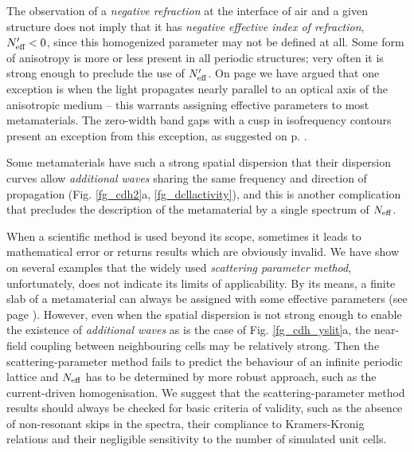 The observation of a \textit{negative refraction} at the interface of air and a given structure does not imply that it has \textit{negative effective index of refraction}, $N_{\text{eff} }'<0$, since this homogenized parameter may not be defined at all. Some form of anisotropy is more or less present in all periodic structures; very often it is strong enough to preclude the use of $N_{\text{eff} }'$. On page \pageref{indexofrefraction} we have argued that one exception is when the light propagates nearly parallel to an optical axis of the anisotropic medium -- this warrants assigning effective parameters to most metamaterials. The zero-width band gaps with a cusp in isofrequency contours present an exception from this exception, as suggested on p. \pageref{diracpoint}. 

Some metamaterials have such a strong spatial dispersion that their dispersion curves allow \textit{additional waves} sharing the same frequency and direction of propagation (Fig. \ref{fg_cdh2}a, \ref{fg_dcllactivity}), and this is another complication that precludes the description of the metamaterial by a single spectrum of $N_{\text{eff} }$. 

When a scientific method is used beyond its scope, sometimes it leads to mathematical error or returns results which are obviously invalid. We have show on several examples that the widely used \textit{scattering parameter method}, unfortunately, does not indicate its limits of applicability. By its means, a finite slab of a metamaterial can always be assigned with some effective parameters (see page \pageref{sparamweaknesses}). However, even when the spatial dispersion is not strong enough to enable the existence of \textit{additional waves} as is the case of Fig. \ref{fg_cdh_yslit}a, the near-field coupling between neighbouring cells may be relatively strong. Then the scattering-parameter method fails to predict the behaviour of an infinite periodic lattice and $N_{\text{eff} }$ has to be determined by more robust approach, such as the current-driven homogenisation. We suggest that the scattering-parameter method results should always be checked for basic criteria of validity, such as the absence of non-resonant skips in the spectra, their compliance to Kramers-Kronig relations and their negligible sensitivity to the number of simulated unit cells.

